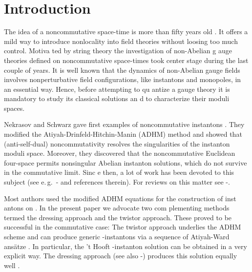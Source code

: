 \documentclass[a4paper,11pt,english]{article}
\numberwithin{equation}{section}
\renewcommand{\=}{\ =\ }
\begin{document}

\section{Introduction}

The idea of a noncommutative space-time is more than fifty years old 
\cite{Snyder:1947qz}. It offers a mild way to introduce nonlocality %
 into field theories without loosing too much control. Motiva%
ted by string theory \cite{Seiberg:1999vs} the investigation of non-Abelian g%
auge theories defined on noncommutative space-times took center stage %
 during the last couple of years. It is well known that 
 the dynamics of non-Abelian gauge fields involves nonperturbative field %
 configurations, like instantons and monopoles, in an essential way. 
Hence, before attempting to qu%
antize a gauge theory it is mandatory to study its classical solutions an%
d to characterize their moduli spaces. %

Nekrasov and Schwarz gave first examples of noncommutative instantons 
\cite{Nekrasov:1998ss}. They modified the Atiyah-Drinfeld-Hitchin-Manin (ADHM) 
method \cite{Atiyah:1978ri} and showed that (anti-self-dual) noncommutativity 
resolves the singularities of the instanton moduli space. Moreover, they 
discovered that the noncommutative Euclidean four-space \coordHE{} 
permits nonsingular Abelian instanton solutions, which do not survive in the 
commutative limit. Sinc%
e then, a lot of work has been devoted to this subject (see e.\,g.\ \cite%
{Braden:1999zp}-\cite{Franco-Sollova:2002nn} and references therein). For %
 reviews on this matter see \cite{Nekrasov:2000ih}-\cite{Nekrasov:2002kc}.

Most authors used the modified ADHM equations for the construction of inst%
antons on \coordHE{}. In the present paper we advocate two com%
plementing methods termed the dressing approach and the twistor approach.
These proved to be successful in the commutative case: 
The twistor approach underlies the ADHM %
 scheme \cite{Atiyah:1978ri} and can produce generic \coordHE{}-instantons via a %
 sequence of Atiyah-Ward ans\"atze \cite{Atiyah:1977pw,WardWells}. %
 In particular, the 't Hooft \coordHE{}-instanton solution can be obtained in a %
very explicit way. The dressing approach \cite{zak} (see also 
\cite{Zakharov:pp}-\cite{Ward:vc}) produces this solution equally well 
\cite{Forgacs:1981su}.
\end{document}
